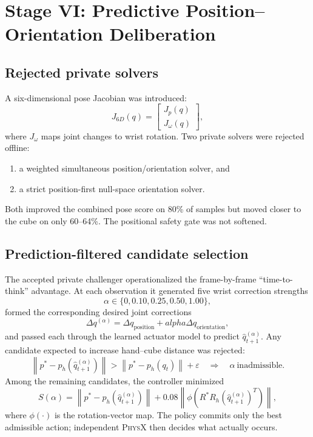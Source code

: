 \documentclass[11pt,a4paper]{article}
\newcommand{\PhysX}{\textsc{PhysX}}
\begin{document}
\section{Stage VI: Predictive Position--Orientation Deliberation}

\subsection{Rejected private solvers}

A six-dimensional pose Jacobian was introduced:
\begin{equation}
J_{6D}(q)=
\begin{bmatrix}
J_p(q)\\J_{\omega}(q)
\end{bmatrix},
\end{equation}
where $J_{\omega}$ maps joint changes to wrist rotation.  Two private solvers
were rejected offline:
\begin{enumerate}
\item a weighted simultaneous position/orientation solver, and
\item a strict position-first null-space orientation solver.
\end{enumerate}
Both improved the combined pose score on 80\% of samples but moved closer to
the cube on only 60--64\%.  The positional safety gate was not softened.

\subsection{Prediction-filtered candidate selection}

The accepted private challenger operationalized the frame-by-frame
``time-to-think'' advantage.  At each observation it generated five wrist
correction strengths
\begin{equation}
\alpha\in\{0,0.10,0.25,0.50,1.00\},
\end{equation}
formed the corresponding desired joint corrections
\begin{equation}
\Delta q^{(\alpha)} =
\Delta q_{\text{position}}+alpha\Delta q_{\text{orientation}},
\end{equation}
and passed each through the learned actuator model to predict
$\hat q_{t+1}^{(\alpha)}$.  Any candidate expected to increase hand--cube
distance was rejected:
\begin{equation}
\left\|p^* - p_h(\hat q_{t+1}^{(\alpha)})\right\|
>
\left\|p^* - p_h(q_t)\right\|+\varepsilon
\quad\Longrightarrow\quad
\alpha\ \text{inadmissible}.
\end{equation}
Among the remaining candidates, the controller minimized
\begin{equation}
S(\alpha)=
\left\|p^* - p_h(\hat q_{t+1}^{(\alpha)})\right\|
+0.08\left\|\phi\!\left(R^*R_h(\hat q_{t+1}^{(\alpha)})^T\right)\right\|,
\label{eq:candidate-score}
\end{equation}
where $\phi(\cdot)$ is the rotation-vector map.  The policy commits only the
best admissible action; independent \PhysX{} then decides what actually occurs.
\end{document}
